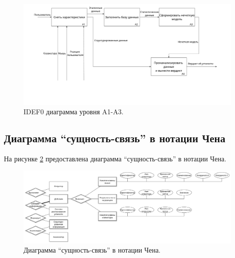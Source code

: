 \begin{figure}[H]
	\centering
	\includegraphics[width=\textwidth]{img/A123.pdf}
	\caption{IDEF0 диаграмма уровня A1-A3.}
	\label{fig:idef:1}
\end{figure}

\subsection{Диаграмма ``сущность-связь'' в нотации Чена}
На рисунке \ref{fig:erDiag} предоставлена диаграмма ``сущность-связь'' в нотации Чена.

\begin{figure}[H]
	\centering
	\includegraphics[width=\textwidth]{img/chenERDiagram.pdf}
	\caption{Диаграмма ``сущность-связь'' в нотации Чена.}
	\label{fig:erDiag}
\end{figure}

